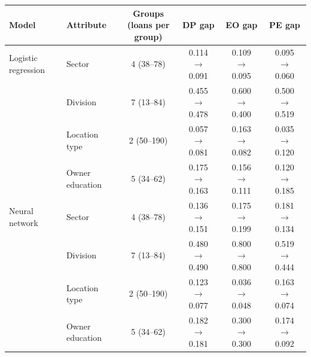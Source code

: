 \begin{tabular}{llcccc}
\toprule
Model & Attribute & \makecell{Groups\\(loans per group)} & DP gap & EO gap & PE gap \\
\midrule
Logistic regression & Sector & 4 (38--78) & 0.114 $\to$ 0.091 & 0.109 $\to$ 0.095 & 0.095 $\to$ 0.060 \\
 & Division & 7 (13--84) & 0.455 $\to$ 0.478 & 0.600 $\to$ 0.400 & 0.500 $\to$ 0.519 \\
 & Location type & 2 (50--190) & 0.057 $\to$ 0.081 & 0.163 $\to$ 0.082 & 0.035 $\to$ 0.120 \\
 & Owner education & 5 (34--62) & 0.175 $\to$ 0.163 & 0.156 $\to$ 0.111 & 0.120 $\to$ 0.185 \\
\midrule
Neural network & Sector & 4 (38--78) & 0.136 $\to$ 0.151 & 0.175 $\to$ 0.199 & 0.181 $\to$ 0.134 \\
 & Division & 7 (13--84) & 0.480 $\to$ 0.490 & 0.800 $\to$ 0.800 & 0.519 $\to$ 0.444 \\
 & Location type & 2 (50--190) & 0.123 $\to$ 0.077 & 0.036 $\to$ 0.048 & 0.163 $\to$ 0.074 \\
 & Owner education & 5 (34--62) & 0.182 $\to$ 0.181 & 0.300 $\to$ 0.300 & 0.174 $\to$ 0.092 \\
\bottomrule
\end{tabular}
